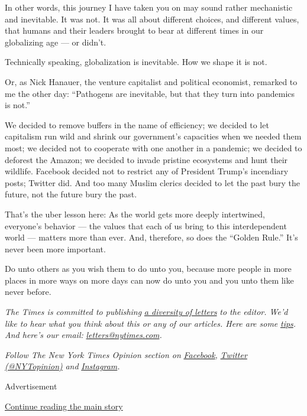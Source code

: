 In other words, this journey I have taken you on may sound rather
mechanistic and inevitable. It was not. It was all about different
choices, and different values, that humans and their leaders brought to
bear at different times in our globalizing age --- or didn't.

Technically speaking, globalization is inevitable. How we shape it is
not.

Or, as Nick Hanauer, the venture capitalist and political economist,
remarked to me the other day: ``Pathogens are inevitable, but that they
turn into pandemics is not.''

We decided to remove buffers in the name of efficiency; we decided to
let capitalism run wild and shrink our government's capacities when we
needed them most; we decided not to cooperate with one another in a
pandemic; we decided to deforest the Amazon; we decided to invade
pristine ecosystems and hunt their wildlife. Facebook decided not to
restrict any of President Trump's incendiary posts; Twitter did. And too
many Muslim clerics decided to let the past bury the future, not the
future bury the past.

That's the uber lesson here: As the world gets more deeply intertwined,
everyone's behavior --- the values that each of us bring to this
interdependent world --- matters more than ever. And, therefore, so does
the ``Golden Rule.'' It's never been more important.

Do unto others as you wish them to do unto you, because more people in
more places in more ways on more days can now do unto you and you unto
them like never before.

\emph{The Times is committed to publishing}
\href{https://www.nytimes.com/2019/01/31/opinion/letters/letters-to-editor-new-york-times-women.html}{\emph{a
diversity of letters}} \emph{to the editor. We'd like to hear what you
think about this or any of our articles. Here are some}
\href{https://help.nytimes.com/hc/en-us/articles/115014925288-How-to-submit-a-letter-to-the-editor}{\emph{tips}}\emph{.
And here's our email:}
\href{mailto:letters@nytimes.com}{\emph{letters@nytimes.com}}\emph{.}

\emph{Follow The New York Times Opinion section on}
\href{https://www.facebook.com/nytopinion}{\emph{Facebook}}\emph{,}
\href{http://twitter.com/NYTOpinion}{\emph{Twitter (@NYTopinion)}}
\emph{and}
\href{https://www.instagram.com/nytopinion/}{\emph{Instagram}}\emph{.}

Advertisement

\protect\hyperlink{after-bottom}{Continue reading the main story}

